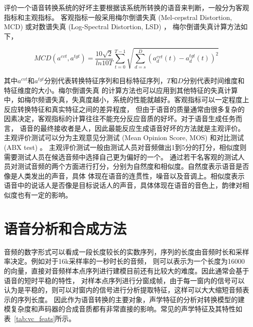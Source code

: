 评价一个语音转换系统的好坏主要根据该系统所转换的语音来判断，一般分为客观指标和主观指标。
客观指标一般采用梅尔倒谱失真 (Mel-cepstral Distortion, MCD) 或对数谱失真 (Log-Spectral Distortion, LSD) ，
梅尔倒谱失真计算方法如下，

$$MCD(a^{cvt}, a^{tgt})=\frac{10\sqrt{2}}{ln10T}\sum^{T-1}_{t=0}\sqrt{\sum^{D}_{d=s}(a^{cvt}_{d}(t)-a^{tgt}_{d}(t))^2}$$

其中$a^{cvt}$和$a^{tgt}$分别代表转换特征序列和目标特征序列，$T$和$D$分别代表时间维度和特征维度的大小。梅尔倒谱失真
的计算方法也可以应用到其他特征的失真计算中，如梅尔频谱失真，失真度越小，系统的性能就越好。客观指标可以一定程度上反应转换特征和真实特征之间的差异程度，
但由于语音的质量通常由很多复杂的因素决定，客观指标的计算往往不能充分反应音质的好坏。对于语音生成任务而言，
语音的最终接收者是人，因此最能反应生成语音好坏的方法就是主观评价。主观评价测试可以分为主观意见分测试 (Mean Opinion Score, MOS) 和对比测试 (ABX test) 。
主观评价测试一般由测试人员对音频做出1到5分的打分，相似度则需要测试人员在候选音频中选择自己更为偏好的一个。
通过若干名客观的测试人员对测试音频的两个方面进行打分，分别为自然度和相似度。自然度表示语音是否像是人类发出的声音，具体
体现在语音的连贯性，噪音以及音调上。相似度表示语音中的说话人是否像是目标说话人的声音，具体体现在语音的音色上，韵律对相似度也有一定的影响。


\section{语音分析和合成方法}
音频的数字形式可以看成一段长度较长的实数序列，序列的长度由音频时长和采样率决定。例如对于16k采样率的一秒时长的音频，
则可以表示为一个长度为16000的向量，直接对音频样本点序列进行建模目前还有比较大的难度。因此通常会基于语音的短时平稳的特性，
对样本点序列进行分窗成帧，由于每一窗内的信号可以认为是平稳的，则可以对窗内的信号进行分析提取特征，这样可以大大缩短音频表示的序列长度。
因此作为语音转换的主要对象，声学特征的分析对转换模型的建模复杂度和声码器的合成音质都有非常直接的影响。常见的声学特征及其特性如表~\ref{tab:vc_feats}所示\cite{Nurminen2012Voice}。


